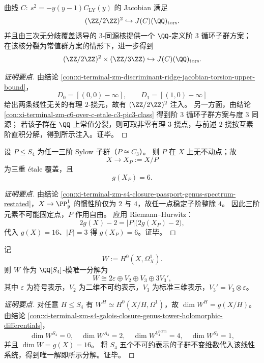 \begin{conclusion}\label{con:xi-terminal-zm-discriminant-ridge-jacobian-rational-torsion-lower-bound-2x2x3}
曲线
\(
C:\ s^2=-y(y-1)C_{\mathrm{LY}}(y)
\)
的 Jacobian 满足
\[
(\ZZ/2\ZZ)^2\hookrightarrow J(C)(\QQ)_{\mathrm{tors}}.
\]
并且由三次无分歧覆盖诱导的 \(3\)-同源核提供一个 \(\QQ\)-定义阶 \(3\) 循环子群方案；
在该核分裂为常值群方案的情形下，进一步得到
\[
(\ZZ/2\ZZ)^2\times(\ZZ/3\ZZ)\hookrightarrow J(C)(\QQ)_{\mathrm{tors}}.
\]
\end{conclusion}
\begin{proof}[证明要点]
由结论 \ref{con:xi-terminal-zm-discriminant-ridge-jacobian-torsion-upper-bound}，
\[
D_0=[(0,0)-\infty],\qquad D_1=[(1,0)-\infty]
\]
给出两条线性无关的有理 \(2\)-挠元，故有 \((\ZZ/2\ZZ)^2\) 注入。
另一方面，由结论 \ref{con:xi-terminal-zm-c6-over-c-etale-c3-pic3-class} 得到阶 \(3\) 循环子群方案与度 \(3\) 同源；
若该子群在 \(\QQ\) 上常值分裂，则可取非零有理 \(3\)-挠点，与前述 \(2\)-挠按互素阶直积分解，得到所示注入。证毕。
\end{proof}

\begin{conclusion}\label{con:xi-terminal-zm-sylow3-free-action-genus6-quotient}
设 \(P\le S_4\) 为任一三阶 Sylow 子群（\(P\cong C_3\)）。
则 \(P\) 在 \(X\) 上无不动点；故
\[
X\to X_P:=X/P
\]
为三重 \'{e}tale 覆盖，且
\[
g(X_P)=6.
\]
\end{conclusion}
\begin{proof}[证明要点]
由结论 \ref{con:xi-terminal-zm-s4-closure-passport-genus-spectrum-restated}，\(X\to\PP^1_y\) 的惯性阶仅为 \(2\) 与 \(4\)，故任一点稳定子阶整除 \(4\)。
因此三阶元素不可能固定点，\(P\) 作用自由。
应用 Riemann--Hurwitz：
\[
2g(X)-2=|P|\bigl(2g(X_P)-2\bigr),
\]
代入 \(g(X)=16\)、\(|P|=3\) 得 \(g(X_P)=6\)。证毕。
\end{proof}

\begin{conclusion}\label{con:xi-terminal-zm-holomorphic-differential-s4-decomposition-rigid-restated}
记
\[
W:=H^0(X,\Omega^1_X).
\]
则 \(W\) 作为 \(\QQ[S_4]\)-模唯一分解为
\[
W\cong 2\varepsilon\oplus V_2\oplus V_3\oplus 3V_3',
\]
其中 \(\varepsilon\) 为符号表示，\(V_2\) 为二维不可约表示，\(V_3\) 为标准三维表示，\(V_3'=V_3\otimes\varepsilon\)。
\end{conclusion}
\begin{proof}[证明要点]
对任意 \(H\le S_4\) 有
\(
W^H\simeq H^0(X/H,\Omega^1)
\)，故 \(\dim W^H=g(X/H)\)。
由结论 \ref{con:xi-terminal-zm-s4-galois-closure-genus-tower-holomorphic-differentials}，
\[
\dim W^{S_4}=0,\quad
\dim W^{A_4}=2,\quad
\dim W^{V_4^{\mathrm{norm}}}=4,\quad
\dim W^{S_3}=1,
\]
并且 \(\dim W=g(X)=16\)。
将 \(S_4\) 五个不可约表示的子群不变维数代入该线性系统，得到唯一解即所示分解。证毕。
\end{proof}

